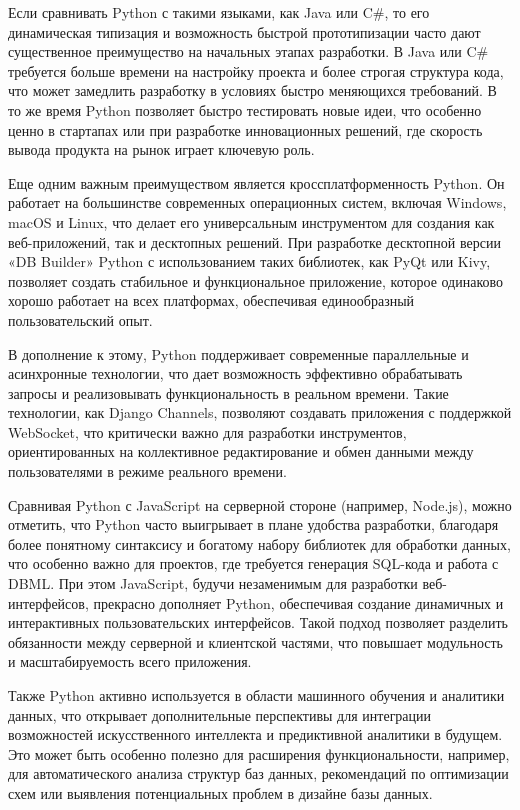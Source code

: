 Если сравнивать Python с такими языками, как Java или C#, то его динамическая типизация и возможность быстрой прототипизации часто дают существенное преимущество на начальных этапах разработки. В Java или C# требуется больше времени на настройку проекта и более строгая структура кода, что может замедлить разработку в условиях быстро меняющихся требований. В то же время Python позволяет быстро тестировать новые идеи, что особенно ценно в стартапах или при разработке инновационных решений, где скорость вывода продукта на рынок играет ключевую роль.

Еще одним важным преимуществом является кроссплатформенность Python. Он работает на большинстве современных операционных систем, включая Windows, macOS и Linux, что делает его универсальным инструментом для создания как веб-приложений, так и десктопных решений. При разработке десктопной версии «DB Builder» Python с использованием таких библиотек, как PyQt или Kivy, позволяет создать стабильное и функциональное приложение, которое одинаково хорошо работает на всех платформах, обеспечивая единообразный пользовательский опыт.

В дополнение к этому, Python поддерживает современные параллельные и асинхронные технологии, что дает возможность эффективно обрабатывать запросы и реализовывать функциональность в реальном времени. Такие технологии, как Django Channels, позволяют создавать приложения с поддержкой WebSocket, что критически важно для разработки инструментов, ориентированных на коллективное редактирование и обмен данными между пользователями в режиме реального времени.

Сравнивая Python с JavaScript на серверной стороне (например, Node.js), можно отметить, что Python часто выигрывает в плане удобства разработки, благодаря более понятному синтаксису и богатому набору библиотек для обработки данных, что особенно важно для проектов, где требуется генерация SQL-кода и работа с DBML. При этом JavaScript, будучи незаменимым для разработки веб-интерфейсов, прекрасно дополняет Python, обеспечивая создание динамичных и интерактивных пользовательских интерфейсов. Такой подход позволяет разделить обязанности между серверной и клиентской частями, что повышает модульность и масштабируемость всего приложения.

Также Python активно используется в области машинного обучения и аналитики данных, что открывает дополнительные перспективы для интеграции возможностей искусственного интеллекта и предиктивной аналитики в будущем. Это может быть особенно полезно для расширения функциональности, например, для автоматического анализа структур баз данных, рекомендаций по оптимизации схем или выявления потенциальных проблем в дизайне базы данных.

